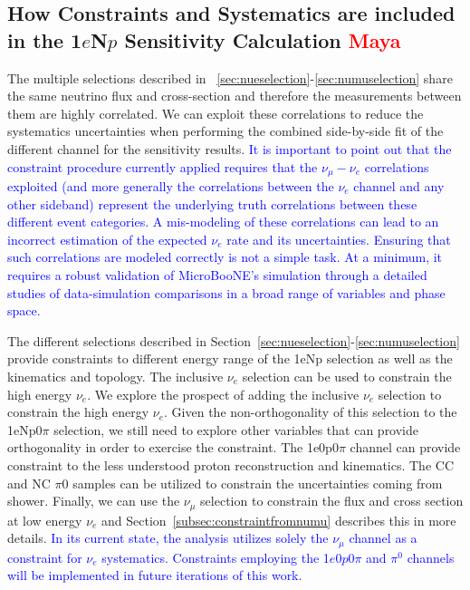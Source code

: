 \documentclass[a4paper]{article}
\newcommand{\zpsel}{1$e$0$p$0$\pi$ }
\begin{document}
\subsection{How Constraints and Systematics are included in the 1$e$N$p$ Sensitivity Calculation \textcolor{red}{Maya}}
\label{ssec:finalSensitivityCalc}

The multiple selections described in  ~\ref{sec:nueselection}-\ref{sec:numuselection} share the same neutrino flux and cross-section and therefore the measurements between them are highly correlated. We can exploit these correlations to reduce the systematics uncertainties when performing the combined side-by-side fit of the different channel for the sensitivity results. \textcolor{blue}{It is important to point out that the constraint procedure currently applied requires that the $\nu_{\mu} - \nu_e$ correlations exploited (and more generally the correlations between the $\nu_e$ channel and any other sideband) represent the underlying truth correlations between these different event categories. A mis-modeling of these correlations can lead to an incorrect estimation of the expected $\nu_e$ rate and its uncertainties. Ensuring that such correlations are modeled correctly is not a simple task. At a minimum, it requires a robust validation of MicroBooNE's simulation through a detailed studies of data-simulation comparisons in a broad range of variables and phase space.}

The different selections described in Section~\ref{sec:nueselection}-\ref{sec:numuselection} provide constraints to different energy range of the 1eNp selection as well as the kinematics and topology. The inclusive $\nu_e$ selection can be used to constrain the high energy $\nu_e$. We explore the prospect of adding the inclusive $\nu_e$ selection to constrain the high energy $\nu_e$. Given the non-orthogonality of this selection to the 1eNp0$\pi$ selection, we still need to explore other variables that can provide orthogonality in order to exercise the constraint. The 1e0p0$\pi$ channel can provide constraint to the less understood proton reconstruction and kinematics. The CC and NC $\pi0$ samples can be utilized to constrain the uncertainties coming from shower. Finally, we can use the $\nu_\mu$ selection to constrain the flux and cross section at low energy $\nu_e$ and Section~\ref{subsec:constraintfromnumu} describes this in more details. \textcolor{blue}{In its current state, the analysis utilizes solely the  $\nu_{\mu}$ channel as a constraint for $\nu_e$ systematics. Constraints employing the \zpsel and $\pi^0$ channels will be implemented in future iterations of this work.}
\end{document}
